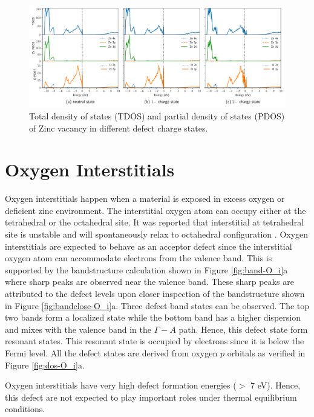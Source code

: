 \clearpage

\begin{figure}[t!]
	\centering
	\includegraphics[width=1\textwidth]{"images/rnd/Zn_vac-dos"}
	\caption[Total density of states (TDOS) and partial density of states (PDOS) of Zinc vacancy in different  defect charge states]{Total density of states (TDOS) and partial density of states (PDOS) of Zinc vacancy in different  defect charge states.}
	\label{fig:dos-Zn_vac}
\end{figure}


\section{Oxygen Interstitials}
Oxygen interstitials happen when a material is exposed in excess oxygen or deficient zinc environment. The interstitial oxygen atom can occupy either at the tetrahedral or the octahedral site. It was reported that interstitial at tetrahedral site is unstable and will spontaneously relax to octahedral configuration \citep{Erhart2005}. Oxygen interstitials are expected to behave as an acceptor defect since the interstitial oxygen atom can accommodate electrons from the valence band. This is supported by the bandstructure calculation shown in Figure \ref{fig:band-O_i}a where sharp peaks are observed near the valence band.  These sharp peaks are attributed to the defect levels upon  closer inspection of the bandstructure shown in Figure \ref{fig:bandclose-O_i}a. Three defect band states can be observed. The top two bands form a localized state while the bottom band has a higher dispersion and mixes with the valence band in the $\Gamma-A$ path. Hence, this defect state form resonant states. This resonant state is occupied by electrons since it is below the Fermi level. All the defect states are derived from oxygen $p$ orbitals as verified in Figure \ref{fig:dos-O_i}a.

Oxygen interstitials have very high defect formation energies ($>$ 7 eV). Hence, this defect are not expected to play important roles under thermal equilibrium conditions.

